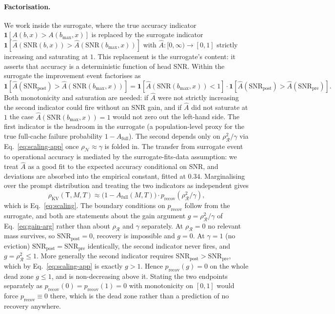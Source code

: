 \paragraph{Factorisation.} We work inside the surrogate, where the
true accuracy indicator $\mathbf{1}[A(b, x) > A(b_{\max}, x)]$ is replaced
by the surrogate indicator
$\mathbf{1}[\hat A(\mathrm{SNR}(b, x)) > \hat A(\mathrm{SNR}(b_{\max}, x))]$
with $\hat A: [0, \infty) \to [0, 1]$ strictly increasing and saturating at
$1$. This replacement is the surrogate's content: it asserts that accuracy
is a deterministic function of head SNR. Within the surrogate the
improvement event factorises as
\[
\mathbf{1}[\hat A(\mathrm{SNR}_{\mathrm{post}}) > \hat A(\mathrm{SNR}(b_{\max}, x))]
= \mathbf{1}[\hat A(\mathrm{SNR}(b_{\max}, x)) < 1] \cdot
\mathbf{1}[\hat A(\mathrm{SNR}_{\mathrm{post}}) > \hat A(\mathrm{SNR}_{\mathrm{pre}})].
\]
Both monotonicity and saturation are needed: if $\hat A$ were not strictly
increasing the second indicator could fire without an SNR gain, and if
$\hat A$ did not saturate at $1$ the case $\hat A(\mathrm{SNR}(b_{\max}, x)) = 1$
would not zero out the left-hand side. The first indicator is the headroom
in the surrogate (a population-level proxy for the true full-cache failure
probability $1 - A_{\mathrm{full}}$). The second depends only on
$\rho_{\mathcal{R}}^2/\gamma$ via Eq.~\eqref{eq:scaling-app} once
$\rho_{\mathcal{N}} \approx \gamma$ is folded in. The transfer from
surrogate event to operational accuracy is mediated by the
surrogate-fits-data assumption: we treat $\hat A$ as a good fit to the
expected accuracy conditional on SNR, and deviations are absorbed into the
empirical constant, fitted at $0.34$. Marginalising over the prompt
distribution and treating the two indicators as independent gives
\[
\rho_{\mathrm{KV}}(\mathsf{T}, M, T) \approx
\bigl(1 - A_{\mathrm{full}}(M, T)\bigr) \cdot
p_{\mathrm{recov}}(\rho_{\mathcal{R}}^2 / \gamma),
\]
which is Eq.~\eqref{eq:scaling}. The boundary conditions on $p_{\mathrm{recov}}$
follow from the surrogate, and both are statements about the gain argument
$g = \rho_{\mathcal{R}}^2/\gamma$ of Eq.~\eqref{eq:gain-arg} rather than about
$\rho_{\mathcal{R}}$ and $\gamma$ separately. At $\rho_{\mathcal{R}} = 0$ no
relevant mass survives, so $\mathrm{SNR}_{\mathrm{post}} = 0$, recovery is
impossible and $g = 0$. At $\gamma = 1$ (no eviction)
$\mathrm{SNR}_{\mathrm{post}} = \mathrm{SNR}_{\mathrm{pre}}$ identically, the
second indicator never fires, and $g = \rho_{\mathcal{R}}^2 \le 1$. More
generally the second indicator requires $\mathrm{SNR}_{\mathrm{post}} >
\mathrm{SNR}_{\mathrm{pre}}$, which by Eq.~\eqref{eq:scaling-app} is exactly
$g > 1$. Hence $p_{\mathrm{recov}}(g) = 0$ on the whole dead zone $g \le 1$,
and is non-decreasing above it. Stating the two endpoints separately as
$p_{\mathrm{recov}}(0) = p_{\mathrm{recov}}(1) = 0$ with monotonicity on
$[0, 1]$ would force $p_{\mathrm{recov}} \equiv 0$ there, which is the dead
zone rather than a prediction of no recovery anywhere.

